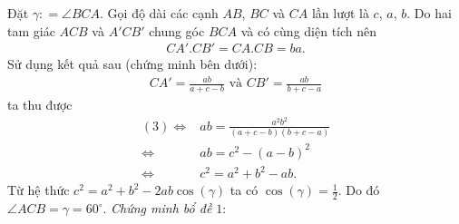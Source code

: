 \begin{multicols}{2}
\begin{figure}[H]
{}
		\vspace*{-10pt}
		\end{figure}
		Đặt $\gamma \colon = \angle BCA$. Gọi độ dài các cạnh $AB$, $BC$ và $CA$ lần lượt là $c$, $a$, $b$. 
		Do hai tam giác $ACB$ và $A'CB'$ chung góc $BCA$ và có cùng diện tích nên 
		\begin{align*}
			CA' . CB' = CA . CB = ba. 
		\end{align*}
		Sử dụng kết quả sau (chứng minh bên dưới):
		\begin{align*}
			CA' = \frac{ab}{a+c-b} \text{ và } CB' = \frac{ab}{b+c-a}
		\end{align*}
		ta thu được
		\begin{align*}
			(3) \Leftrightarrow & ab  = \frac{a^2b^2}{(a+c-b)(b+c-a)} \\
			\Leftrightarrow & ab = c^2 - (a-b)^2 \\
			\Leftrightarrow & c^2 = a^2 + b^2 - ab.
		\end{align*}
		Từ hệ thức $c^2 = a^2 + b^2 - 2 ab \cos(\gamma)$ ta có $\cos(\gamma) = \frac{1}{2}$. Do đó $\angle ACB = \gamma = 60^{\circ}$.
		\vskip 0.1cm
		\textit{Chứng minh bổ đề $1$}:
		\begin{figure}[H]
			\vspace*{-5pt}
			\centering
\end{figure}
\end{multicols}
